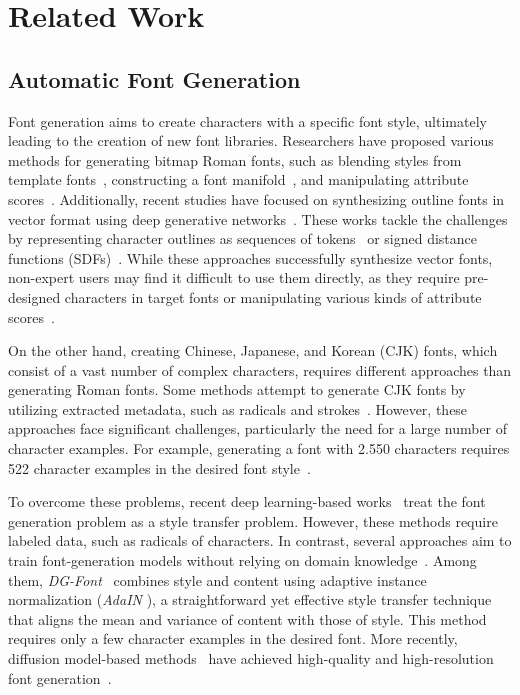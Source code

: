 \section{Related Work}

\subsection{Automatic Font Generation}
Font generation aims to create characters with a specific font style, ultimately leading to the creation of new font libraries.
Researchers have proposed various methods for generating bitmap Roman fonts, such as blending styles from template fonts~\cite{Igarashi2010}, constructing a font manifold~\cite{CampbellFontManifold2014}, and manipulating attribute scores~\cite{wang2020attribute2font}.
Additionally, recent studies have focused on synthesizing outline fonts in vector format using deep generative networks~\cite{liu2023dualvector, xia2023vecfontsdf, wang2021deepvecfont, wang2023deepvecfontv2, thamizharasan2024vecfusion}.
These works tackle the challenges by representing character outlines as sequences of tokens~\cite{wang2021deepvecfont, wang2023deepvecfontv2} or signed distance functions (SDFs)~\cite{liu2023dualvector, xia2023vecfontsdf}.
While these approaches successfully synthesize vector fonts, non-expert users may find it difficult to use them directly, as they require pre-designed characters in target fonts or manipulating various kinds of attribute scores~\cite{wang2020attribute2font}.

On the other hand, creating Chinese, Japanese, and Korean (CJK) fonts, which consist of a vast number of complex characters, requires different approaches than generating Roman fonts.
Some methods attempt to generate CJK fonts by utilizing extracted metadata, such as radicals and strokes~\cite{LianEasyFont2017, SounghuaAutomaticGeneration2009, ZhouEasyGeneration2011, ZongStrokeBank2014}.
However, these approaches face significant challenges, particularly the need for a large number of character examples.
For example, generating a font with \num{2,550} characters requires \num{522} character examples in the desired font style~\cite{LianEasyFont2017}.

To overcome these problems, recent deep learning-based works~\cite{YuchenZi2zi2017,ChaDMFont2020,JiangDCFont2017,ParkMultipleHeads2021,SunSAVAE2018} treat the font generation problem as a style transfer problem.
However, these methods require labeled data, such as radicals of characters.
In contrast, several approaches aim to train font-generation models without relying on domain knowledge~\cite{JiangDCFont2017, XieDGFont2021, ZhangEMD2018, liu2024qtfont, yang2024fontdiffuser}.
Among them, \textit{DG-Font}~\cite{XieDGFont2021} combines style and content using adaptive instance normalization (\textit{AdaIN} \cite{HuangAdaIN2017}), a straightforward yet effective style transfer technique that aligns the mean and variance of content with those of style.
This method requires only a few character examples in the desired font.
More recently, diffusion model-based methods~\cite{ho2020denoising} have achieved high-quality and high-resolution font generation~\cite{liu2024qtfont, yang2024fontdiffuser, he2024difffont, fu2024MSD}.

